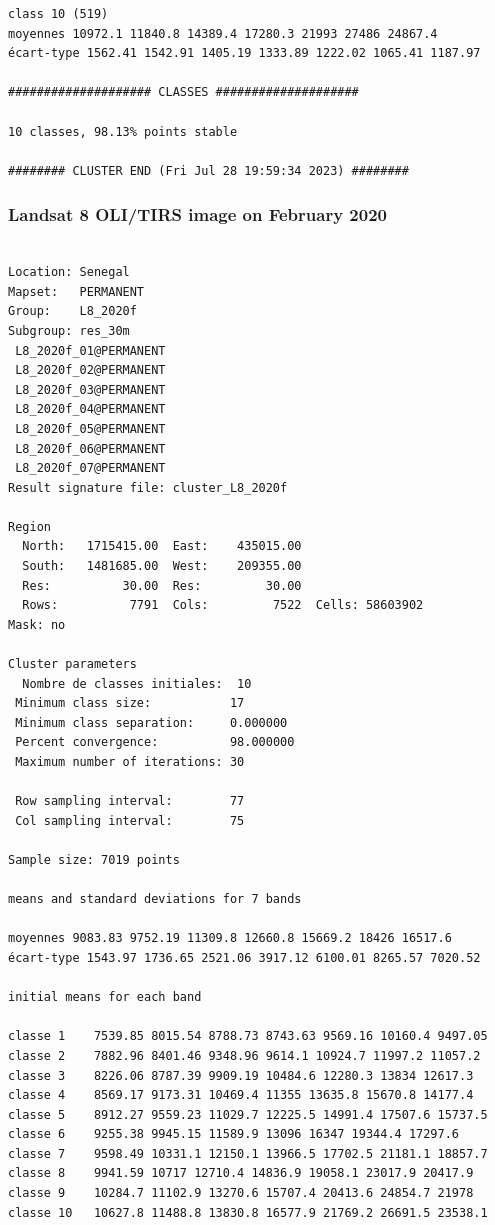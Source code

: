 \documentclass[earth,article,submit,pdftex,moreauthors]{Definitions/mdpi}
\begin{document}
{\begin{scriptsize}
\begin{verbatim}
class 10 (519)
moyennes 10972.1 11840.8 14389.4 17280.3 21993 27486 24867.4
écart-type 1562.41 1542.91 1405.19 1333.89 1222.02 1065.41 1187.97

#################### CLASSES ####################

10 classes, 98.13% points stable

######## CLUSTER END (Fri Jul 28 19:59:34 2023) ########

\end{verbatim}
\end{scriptsize}

\subsubsection[\appendixname~\thesubsubsection]{Landsat 8 OLI/TIRS image on February 2020}
\begin{scriptsize}
\begin{verbatim}

Location: Senegal
Mapset:   PERMANENT
Group:    L8_2020f
Subgroup: res_30m
 L8_2020f_01@PERMANENT
 L8_2020f_02@PERMANENT
 L8_2020f_03@PERMANENT
 L8_2020f_04@PERMANENT
 L8_2020f_05@PERMANENT
 L8_2020f_06@PERMANENT
 L8_2020f_07@PERMANENT
Result signature file: cluster_L8_2020f

Region
  North:   1715415.00  East:    435015.00
  South:   1481685.00  West:    209355.00
  Res:          30.00  Res:         30.00
  Rows:          7791  Cols:         7522  Cells: 58603902
Mask: no

Cluster parameters
  Nombre de classes initiales: 	10
 Minimum class size:           17
 Minimum class separation:     0.000000
 Percent convergence:          98.000000
 Maximum number of iterations: 30

 Row sampling interval:        77
 Col sampling interval:        75

Sample size: 7019 points

means and standard deviations for 7 bands

moyennes 9083.83 9752.19 11309.8 12660.8 15669.2 18426 16517.6
écart-type 1543.97 1736.65 2521.06 3917.12 6100.01 8265.57 7020.52

initial means for each band

classe 1    7539.85 8015.54 8788.73 8743.63 9569.16 10160.4 9497.05
classe 2    7882.96 8401.46 9348.96 9614.1 10924.7 11997.2 11057.2
classe 3    8226.06 8787.39 9909.19 10484.6 12280.3 13834 12617.3
classe 4    8569.17 9173.31 10469.4 11355 13635.8 15670.8 14177.4
classe 5    8912.27 9559.23 11029.7 12225.5 14991.4 17507.6 15737.5
classe 6    9255.38 9945.15 11589.9 13096 16347 19344.4 17297.6
classe 7    9598.49 10331.1 12150.1 13966.5 17702.5 21181.1 18857.7
classe 8    9941.59 10717 12710.4 14836.9 19058.1 23017.9 20417.9
classe 9    10284.7 11102.9 13270.6 15707.4 20413.6 24854.7 21978
classe 10   10627.8 11488.8 13830.8 16577.9 21769.2 26691.5 23538.1


\end{verbatim}
\end{scriptsize}}
\end{document}

